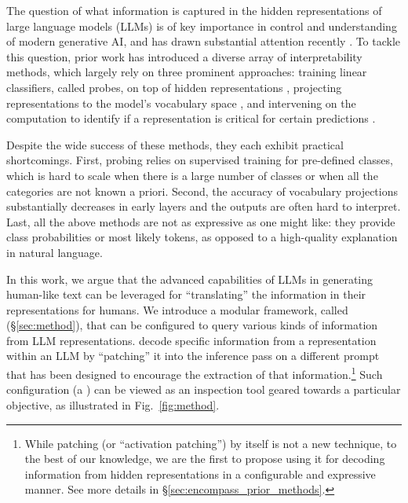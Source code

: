 \documentclass{article}
\theoremstyle{plain}
\theoremstyle{definition}
\theoremstyle{remark}
\begin{document}
The question of what information is captured in the hidden representations of large language models (LLMs) is of key importance in control and understanding of modern generative AI, and has drawn substantial attention recently \cite{casper2022sok, madsen2022post, patel2021mapping, nanda-etal-2023-emergent}. To tackle this question, prior work has introduced a diverse array of interpretability methods, which largely rely on three prominent approaches: training linear classifiers, called probes, on top of hidden representations \cite{belinkov2019analysis, belinkov2022probing, alain2017understanding}, projecting representations to the model's vocabulary space \cite{logitlens,din2023jump,belrose2023eliciting}, and intervening on the computation to identify if a representation is critical for certain predictions \citep{meng2022locating,singh-etal-2020-bertnesia,wang2022interpretability, conmy2023automated,geva-etal-2023-dissecting}. 

Despite the wide success of these methods, they each exhibit practical shortcomings. First, probing relies on supervised training for pre-defined classes, which is hard to scale when there is a large number of classes or when all the categories are not known a priori. Second, the accuracy of vocabulary projections substantially decreases in early layers and the outputs are often hard to interpret. Last, all the above methods are not as expressive as one might like: they provide class probabilities or most likely tokens, as opposed to a high-quality explanation in natural language.

In this work, we argue that the advanced capabilities of LLMs in generating human-like text can be leveraged for ``translating'' the information in their representations for humans. We introduce a modular framework, called \methodFamilyName{} (\S\ref{sec:method}), that can be configured to query various kinds of information from LLM representations.
\methodFamilyName{} decode specific information from a representation within an LLM by ``patching'' it into the inference pass on a different prompt that has been designed to encourage the extraction of that information.\footnote{While patching (or ``activation patching'') by itself is not a new technique, to the best of our knowledge, we are the first to propose using it for decoding information from hidden representations in a configurable and expressive manner. See more details in \S\ref{sec:encompass_prior_methods}.} Such configuration (a \methodName{}) can be viewed as an inspection tool geared towards a particular objective, as illustrated in Fig.~\ref{fig:method}.
\end{document}

